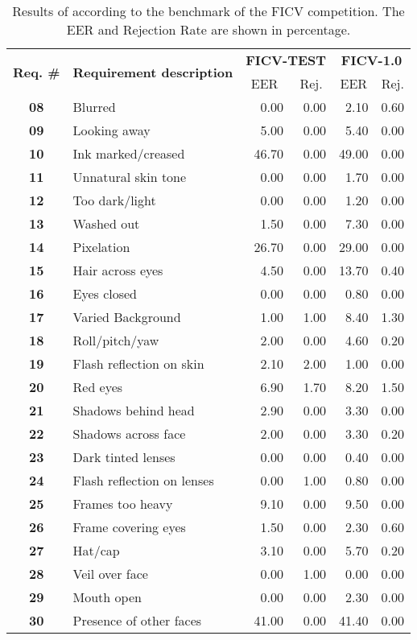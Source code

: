\begin{table}[tb]
\centering
\caption{Results of \methodname according to the benchmark of the FICV competition. The EER and Rejection Rate are shown in percentage.}
\label{tab:icaonet-ficv}
\begin{tabular}{@{}clrrrr@{}}
\toprule
\multirow{2}{*}{\textbf{Req. \#}} & \multicolumn{1}{c}{\multirow{2}{*}{\textbf{Requirement description}}} & \multicolumn{2}{c}{\textbf{FICV-TEST}} & \multicolumn{2}{c}{\textbf{FICV-1.0}} \\ \cmidrule(l){3-6} 
 & \multicolumn{1}{c}{} & \multicolumn{1}{c}{EER} & \multicolumn{1}{c}{Rej.} & \multicolumn{1}{c}{EER} & \multicolumn{1}{c}{Rej.} \\ \midrule
\textbf{08} & Blurred & 0.00 & 0.00 & 2.10 & 0.60 \\
\textbf{09} & Looking away & 5.00 & 0.00 & 5.40 & 0.00 \\
\textbf{10} & Ink marked/creased & 46.70 & 0.00 & 49.00 & 0.00 \\
\textbf{11} & Unnatural skin tone & 0.00 & 0.00 & 1.70 & 0.00 \\
\textbf{12} & Too dark/light & 0.00 & 0.00 & 1.20 & 0.00 \\
\textbf{13} & Washed out & 1.50 & 0.00 & 7.30 & 0.00 \\
\textbf{14} & Pixelation & 26.70 & 0.00 & 29.00 & 0.00 \\
\textbf{15} & Hair across eyes & 4.50 & 0.00 & 13.70 & 0.40 \\
\textbf{16} & Eyes closed & 0.00 & 0.00 & 0.80 & 0.00 \\
\textbf{17} & Varied Background & 1.00 & 1.00 & 8.40 & 1.30 \\
\textbf{18} & Roll/pitch/yaw & 2.00 & 0.00 & 4.60 & 0.20 \\
\textbf{19} & Flash reflection on skin & 2.10 & 2.00 & 1.00 & 0.00 \\
\textbf{20} & Red eyes & 6.90 & 1.70 & 8.20 & 1.50 \\
\textbf{21} & Shadows behind head & 2.90 & 0.00 & 3.30 & 0.00 \\
\textbf{22} & Shadows across face & 2.00 & 0.00 & 3.30 & 0.20 \\
\textbf{23} & Dark tinted lenses & 0.00 & 0.00 & 0.40 & 0.00 \\
\textbf{24} & Flash reflection on lenses & 0.00 & 1.00 & 0.80 & 0.00 \\
\textbf{25} & Frames too heavy & 9.10 & 0.00 & 9.50 & 0.00 \\
\textbf{26} & Frame covering eyes & 1.50 & 0.00 & 2.30 & 0.60 \\
\textbf{27} & Hat/cap & 3.10 & 0.00 & 5.70 & 0.20 \\
\textbf{28} & Veil over face & 0.00 & 1.00 & 0.00 & 0.00 \\
\textbf{29} & Mouth open & 0.00 & 0.00 & 2.30 & 0.00 \\
\textbf{30} & Presence of other faces & 41.00 & 0.00 & 41.40 & 0.00 \\ \bottomrule
\end{tabular}
\end{table}
